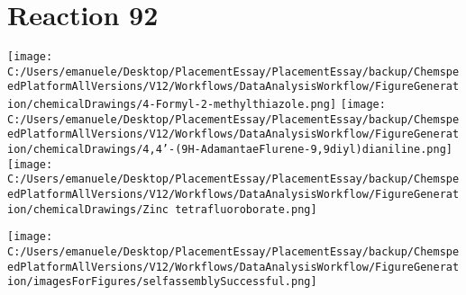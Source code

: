 \documentclass{article}%
\begin{document}
\section*{Reaction 92}%
%
\begin{scheme}[H]%
\begin{minipage}{0.5\textwidth}%
\texttt{[image: C:/Users/emanuele/Desktop/PlacementEssay/PlacementEssay/backup/ChemspeedPlatformAllVersions/V12/Workflows/DataAnalysisWorkflow/FigureGeneration/chemicalDrawings/4-Formyl-2-methylthiazole.png]}%
\texttt{[image: C:/Users/emanuele/Desktop/PlacementEssay/PlacementEssay/backup/ChemspeedPlatformAllVersions/V12/Workflows/DataAnalysisWorkflow/FigureGeneration/chemicalDrawings/4,4'-(9H-AdamantaeFlurene-9,9diyl)dianiline.png]}%
\texttt{[image: C:/Users/emanuele/Desktop/PlacementEssay/PlacementEssay/backup/ChemspeedPlatformAllVersions/V12/Workflows/DataAnalysisWorkflow/FigureGeneration/chemicalDrawings/Zinc tetrafluoroborate.png]}%
\end{minipage}%
\begin{minipage}{0.5\textwidth}%
\begin{center}%
\texttt{[image: C:/Users/emanuele/Desktop/PlacementEssay/PlacementEssay/backup/ChemspeedPlatformAllVersions/V12/Workflows/DataAnalysisWorkflow/FigureGeneration/imagesForFigures/selfassemblySuccessful.png]}%
\end{center}%
\end{minipage}%
\caption{Self-assembly of components 1, 13, with Zinc(II) in a 3.0:1.5:1.0 molar ratio in CH$_3$CN at 60\textdegree C for 40h. These are the reagents (starting materials) for reaction 92.}%
\end{scheme}%
\end{document}
